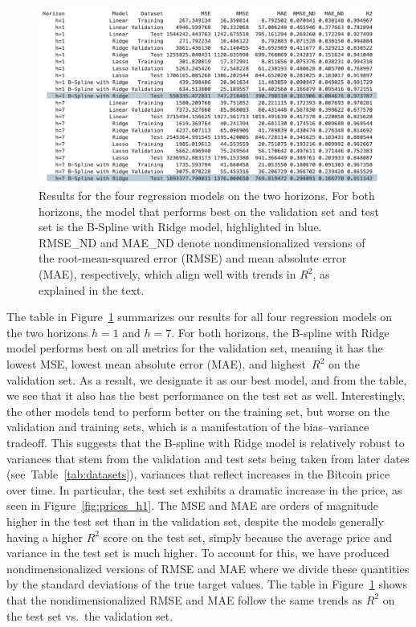 \documentclass{article}
\begin{document}
\begin{figure}[ht]
    \centering
    \includegraphics[width=0.95\linewidth]{figures/summary_table_highlight.png}
    \caption{Results for the four regression models on the two horizons. For both horizons, the model that performs best on the validation set and test set is the B-Spline with Ridge model, highlighted in blue. RMSE\_ND and MAE\_ND denote nondimensionalized versions of the root-mean-squared error (RMSE) and mean absolute error (MAE), respectively, which align well with trends in $R^2$, as explained in the text.}
    \label{fig:summary_table}
\end{figure}

The table in Figure~\ref{fig:summary_table} summarizes our results for all four regression models on the two horizons $h=1$ and $h=7$. For both horizons, the B-spline with Ridge model performs best on all metrics for the validation set, meaning it has the lowest MSE, lowest mean absolute error (MAE), and highest~$R^2$ on the validation set. As a result, we designate it as our best model, and from the table, we see that it also has the best performance on the test set as well. Interestingly, the other models tend to perform better on the training set, but worse on the validation and training sets, which is a manifestation of the bias--variance tradeoff. This suggests that the B-spline with Ridge model is relatively robust to variances that stem from the validation and test sets being taken from later dates (see~Table~\ref{tab:datasets}), variances that reflect increases in the Bitcoin price over time. In particular, the test set exhibits a dramatic increase in the price, as seen in Figure~\ref{fig:prices_h1}. The MSE and MAE are orders of magnitude higher in the test set than in the validation set, despite the models generally having a higher $R^2$ score on the test set, simply because the average price and variance in the test set is much higher. To account for this, we have produced nondimensionalized versions of RMSE and MAE where we divide these quantities by the standard deviations of the true target values. The table in Figure~\ref{fig:summary_table} shows that the nondimensionalized RMSE and MAE follow the same trends as $R^2$ on the test set vs.\ the validation set. 
\end{document}
